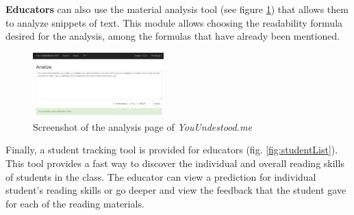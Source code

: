 \documentclass{sig-alternate-05-2015}
\begin{document}
\textbf{Educators} can also use the material analysis tool (see figure \ref{fig:analysispage}) that allows them to analyze snippets of text. This module allows choosing the readability formula desired for the analysis, among the formulas that have already been mentioned.


\begin{figure}[h!]
 \centering
  \includegraphics[width=0.45\textwidth]{creatingFigures/Capture22}
 \caption{Screenshot of the analysis page of \textit{YouUndestood.me}}
 \label{fig:analysispage}
 \end{figure}
 
 
 
Finally, a student tracking tool is provided for educators (fig. \ref{fig:studentList}). This tool provides a fast way to discover the individual and overall reading skills of students in the class. The educator can view a prediction for individual student's reading skills or go deeper and view the feedback that the student gave for each of the reading materials.




%





\end{document}
